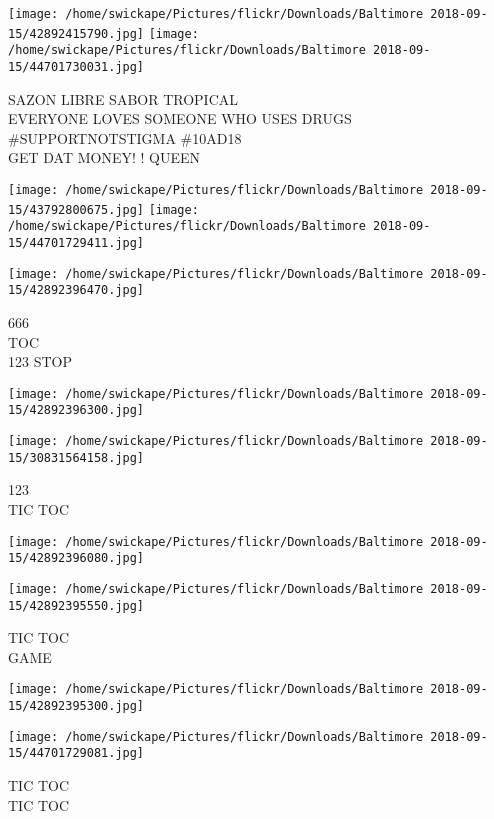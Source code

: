 \documentclass[10pt,letterpaper]{article}
\begin{document}
\vspace{0.25in}
\texttt{[image: /home/swickape/Pictures/flickr/Downloads/Baltimore 2018-09-15/42892415790.jpg]}
\texttt{[image: /home/swickape/Pictures/flickr/Downloads/Baltimore 2018-09-15/44701730031.jpg]}

SAZON LIBRE SABOR TROPICAL\\
EVERYONE LOVES SOMEONE WHO USES DRUGS \#SUPPORTNOTSTIGMA \#10AD18\\
GET DAT MONEY! ! QUEEN
\pagebreak

\texttt{[image: /home/swickape/Pictures/flickr/Downloads/Baltimore 2018-09-15/43792800675.jpg]}
\texttt{[image: /home/swickape/Pictures/flickr/Downloads/Baltimore 2018-09-15/44701729411.jpg]}

\vspace{0.25in}
\texttt{[image: /home/swickape/Pictures/flickr/Downloads/Baltimore 2018-09-15/42892396470.jpg]}

666\\
TOC\\
123 STOP
\pagebreak

\texttt{[image: /home/swickape/Pictures/flickr/Downloads/Baltimore 2018-09-15/42892396300.jpg]}

\vspace{0.25in}
\texttt{[image: /home/swickape/Pictures/flickr/Downloads/Baltimore 2018-09-15/30831564158.jpg]}

123\\
TIC TOC
\pagebreak

\texttt{[image: /home/swickape/Pictures/flickr/Downloads/Baltimore 2018-09-15/42892396080.jpg]}

\vspace{0.25in}
\texttt{[image: /home/swickape/Pictures/flickr/Downloads/Baltimore 2018-09-15/42892395550.jpg]}

TIC TOC\\
GAME
\pagebreak

\texttt{[image: /home/swickape/Pictures/flickr/Downloads/Baltimore 2018-09-15/42892395300.jpg]}

\vspace{0.25in}
\texttt{[image: /home/swickape/Pictures/flickr/Downloads/Baltimore 2018-09-15/44701729081.jpg]}

TIC TOC\\
TIC TOC
\pagebreak
\end{document}

